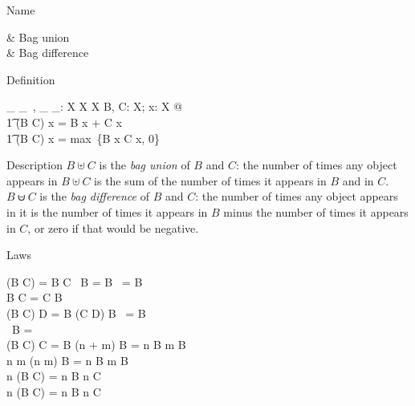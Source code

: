 \begin{manpage}\label{p:5020}
\item[Name]
\begin{name}
        \uplus & Bag union\symdex{$\uplus$} \\
        \uminus & Bag difference%
		\symdex{$\uminus$}
\end{name}

\item[Definition]
\begin{gendef}[X]
        \_ \uplus \_~, \_ \uminus \_: \bag X \cross \bag X \fun \bag X
\where
        \forall B, C: \bag X; x: X @ \\
\t1 	    (B \uplus C) \bcount x = B \bcount x + C \bcount x \land \\
\t1	    (B \uminus C) \bcount x
		= max~\{B \bcount x \minus C \bcount x, 0\}
\end{gendef}

\item[Description] 
$B \uplus C$ is the {\em bag union\/} of $B$ and
$C$: the number of times any object appears in $B \uplus C$ is the
sum of the number of times it appears in $B$ and in $C$. $B \uminus
C$ is the {\em bag difference\/} of $B$ and $C$: the number of times
any object appears in it is the number of times it appears in $B$
minus the number of times it appears in $C$, or zero if that would
be negative.

\item[Laws]
\begin{laws}
        \dom (B \uplus C) = \dom B \cup \dom C
\also
        \lbag~\rbag \uplus B = B \uplus \lbag~\rbag = B \\
        B \uplus C = C \uplus B \\
        (B \uplus C) \uplus D = B \uplus (C \uplus D)
\also
	B \uminus \lbag~\rbag = B \\
	\lbag~\rbag \uminus B = \lbag~\rbag \\
	(B \uplus C) \uminus C = B
\also
	(n + m) \otimes B = n \otimes B \uplus m \otimes B \\
	n \geq m \implies 
	    (n \minus m) \otimes B = n \otimes B \uminus m \otimes B \\
	n \otimes (B \uplus C) = n \otimes B \uplus n \otimes C \\
	n \otimes (B \uminus C) = n \otimes B \uminus n \otimes C \\
\end{laws}
\end{manpage}
